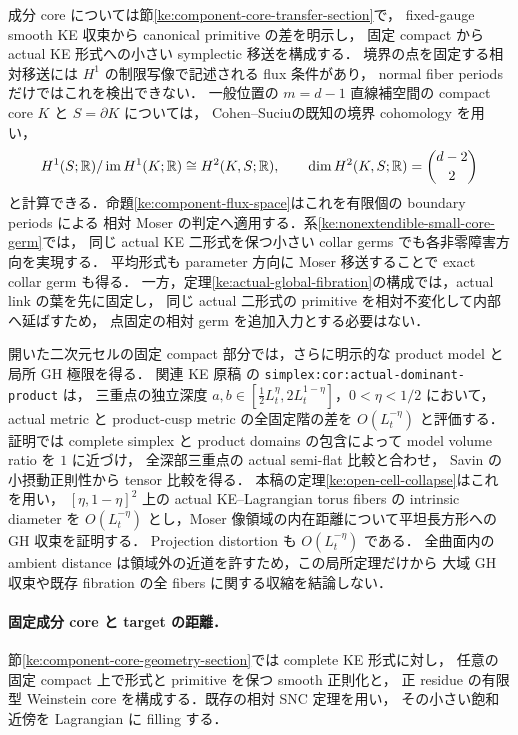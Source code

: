 成分 core については節\ref{ke:component-core-transfer-section}で，
fixed-gauge smooth KE 収束から canonical primitive の差を明示し，
固定 compact から actual KE 形式への小さい symplectic 移送を構成する．
境界の点を固定する相対移送には $H^1$ の制限写像で記述される flux 条件があり，
normal fiber periods だけではこれを検出できない．
一般位置の $m=d-1$ 直線補空間の compact core $K$ と $S=\partial K$ については，
Cohen--Suciu\cite[Proposition~2.5 and \S6.9]{CohenSuciuBoundary}の既知の境界 cohomology を用い，
\[
 H^1(S;\mathbb R)/\operatorname{im}H^1(K;\mathbb R)
 \cong H^2(K,S;\mathbb R),\qquad
 \dim H^2(K,S;\mathbb R)=\binom{d-2}{2}
\]
と計算できる．命題\ref{ke:component-flux-space}はこれを有限個の boundary periods による
相対 Moser の判定へ適用する．系\ref{ke:nonextendible-small-core-germ}では，
同じ actual KE 二形式を保つ小さい collar germs でも各非零障害方向を実現する．
平均形式も parameter 方向に Moser 移送することで exact collar germ も得る．
一方，定理\ref{ke:actual-global-fibration}の構成では，actual link の葉を先に固定し，
同じ actual 二形式の primitive を相対不変化して内部へ延ばすため，
点固定の相対 germ を追加入力とする必要はない．


開いた二次元セルの固定 compact 部分では，さらに明示的な product model と局所 GH 極限を得る．
関連 KE 原稿\cite{KELocalCurrent} の \texttt{simplex:cor:actual-dominant-product} は，
三重点の独立深度 $a,b\in[\tfrac12L_t^\eta,2L_t^{1-\eta}]$，$0<\eta<1/2$ において，
actual metric と product-cusp metric の全固定階の差を $O(L_t^{-\eta})$ と評価する．
証明では complete simplex と product domains の包含によって model volume ratio を $1$ に近づけ，
全深部三重点の actual semi-flat 比較と合わせ，
Savin\cite[Theorem~1.3]{SavinSmall} の小摂動正則性から tensor 比較を得る．
本稿の定理\ref{ke:open-cell-collapse}はこれを用い，
$[\eta,1-\eta]^2$ 上の actual KE--Lagrangian torus fibers の intrinsic diameter を
$O(L_t^{-\eta})$ とし，Moser 像領域の内在距離について平坦長方形への GH 収束を証明する．
Projection distortion も $O(L_t^{-\eta})$ である．
全曲面内の ambient distance は領域外の近道を許すため，この局所定理だけから
大域 GH 収束や既存 fibration の全 fibers に関する収縮を結論しない．

\paragraph{固定成分 core と target の距離．}
節\ref{ke:component-core-geometry-section}では complete KE 形式に対し，
任意の固定 compact 上で形式と primitive を保つ smooth 正則化と，
正 residue の有限型 Weinstein core を構成する．既存の相対 SNC 定理を用い，
その小さい飽和近傍を Lagrangian に filling する．

